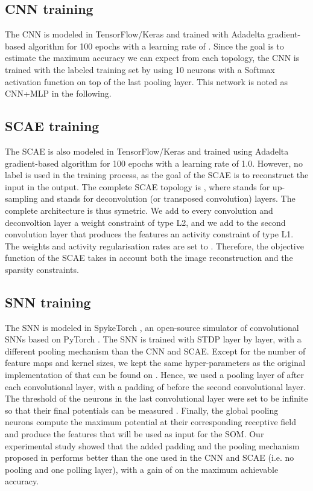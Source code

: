 \documentclass[runningheads]{llncs}
\begin{document}
\subsection{CNN training}
The CNN is modeled in TensorFlow/Keras and trained with Adadelta \cite{zeiler2012adadelta} gradient-based algorithm for 100 epochs with a learning rate of . Since the goal is to estimate the maximum accuracy we can expect from each topology, the CNN is trained with the labeled training set by using 10 neurons with a Softmax activation function on top of the last pooling layer. This network is noted as CNN+MLP in the following.


\subsection{SCAE training}
The SCAE is also modeled in TensorFlow/Keras and trained using Adadelta \cite{zeiler2012adadelta} gradient-based algorithm for 100 epochs with a learning rate of 1.0. However, no label is used in the training process, as the goal of the SCAE is to reconstruct the input in the output. The complete SCAE topology is , where  stands for up-sampling and  stands for deconvolution (or transposed convolution) layers. The complete architecture is thus symetric. We add to every convolution and deconvoltion layer a weight constraint of type L2, and we add to the second convolution layer that produces the features an activity constraint of type L1. The weights and activity regularisation rates are set to . Therefore, the objective function of the SCAE takes in account both the image reconstruction and the sparsity constraints.


\subsection{SNN training}
\label{sec_snn-training}
The SNN is modeled in SpykeTorch \cite{mozafari2019spyketorch}, an open-source simulator of convolutional SNNs based on PyTorch \cite{paszke2019pytorch}. The SNN is trained with STDP layer by layer, with a different pooling mechanism than the CNN and SCAE. Except for the number of feature maps and kernel sizes, we kept the same hyper-parameters as the original implementation of \cite{kheradpisheh2018stdp_cnn} that can be found on \cite{mozafari2019spyketorch}. Hence, we used a pooling layer of  after each convolutional layer, with a padding of  before the second convolutional layer. The threshold of the neurons in the last convolutional layer were set to be infinite so that their final potentials can be measured \cite{kheradpisheh2018stdp_cnn}. 
Finally, the global pooling neurons compute the maximum potential at their corresponding receptive field and produce the features that will be used as input for the SOM. 
Our experimental study showed that the added padding and the pooling mechanism proposed in \cite{mozafari2019spyketorch} performs better than the one used in the CNN and SCAE (i.e. no pooling and one polling layer), with a gain of  on the maximum achievable accuracy.
\end{document}
